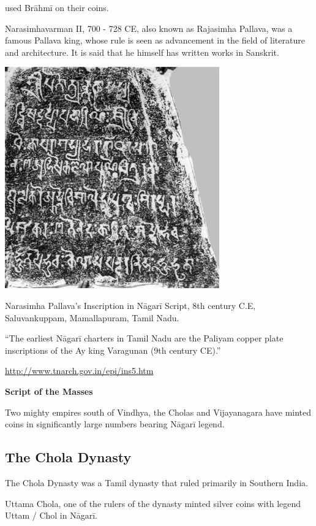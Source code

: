 used Brāhmī on their coins.

Narasimhavarman II, 700 - 728 CE, also known as Rajasimha Pallava, was a famous Pallava king, whose rule is seen as advancement in the field of literature and architecture. It is said that he himself has written works in Sanskrit.

\vskip 7pt

\centerline{\includegraphics[scale=0.65]{"images/article-06/art06-fig07.jpg"}}

Narasimha Pallava’s Inscription in Nāgarī Script, 8th century C.E, Saluvankuppam, Mamallapuram, Tamil Nadu.

“The earliest Nāgarī charters in Tamil Nadu are the Paliyam copper plate inscriptions of the Ay king Varagunan (9th century CE).”

\url{http://www.tnarch.gov.in/epi/ins5.htm}

\textbf{Script of the Masses}

Two mighty empires south of Vindhya, the Cholas and Vijayanagara have minted coins in significantly large numbers bearing Nāgarī legend.


\subsection*{The Chola Dynasty}

The Chola Dynasty was a Tamil dynasty that ruled primarily in Southern India.

Uttama Chola, one of the rulers of the dynasty minted silver coins with legend Uttam / Chol in Nāgarī.

